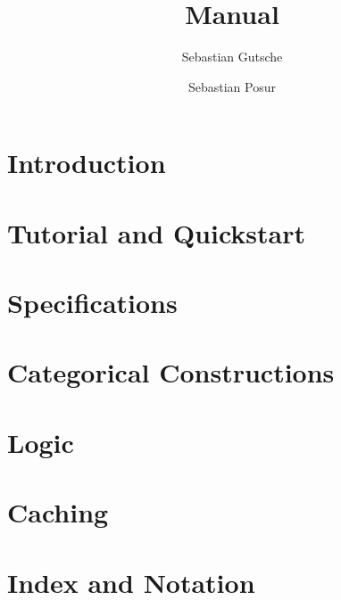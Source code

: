 \documentclass[12pt]{amsbook}
\author{Sebastian Gutsche}
\author{Sebastian Posur}
\begin{document}
\title[Cap Manual]{\CapPkg Manual}

\maketitle

\chapter{Introduction}
  
  
\chapter{Tutorial and Quickstart}
  

\chapter{Specifications}
  

\chapter{Categorical Constructions}
  

\chapter{Logic}
  

\chapter{Caching}\label{chapter:caching}
  

\chapter{Index and Notation}
  





\end{document}
